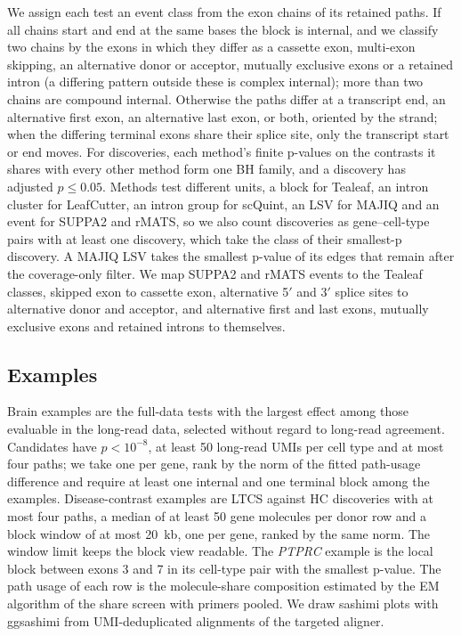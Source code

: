 \documentclass[11pt]{article}
\begin{document}
We assign each test an event class from the exon chains of its retained paths. If all chains start and end at the same bases the block is internal, and we classify two chains by the exons in which they differ as a cassette exon, multi-exon skipping, an alternative donor or acceptor, mutually exclusive exons or a retained intron (a differing pattern outside these is complex internal); more than two chains are compound internal. Otherwise the paths differ at a transcript end, an alternative first exon, an alternative last exon, or both, oriented by the strand; when the differing terminal exons share their splice site, only the transcript start or end moves. For discoveries, each method's finite p-values on the contrasts it shares with every other method form one BH family, and a discovery has adjusted $p\le0.05$. Methods test different units, a block for Tealeaf, an intron cluster for LeafCutter, an intron group for scQuint, an LSV for MAJIQ and an event for SUPPA2 and rMATS, so we also count discoveries as gene--cell-type pairs with at least one discovery, which take the class of their smallest-p discovery. A MAJIQ LSV takes the smallest p-value of its edges that remain after the coverage-only filter. We map SUPPA2 and rMATS events to the Tealeaf classes, skipped exon to cassette exon, alternative 5$'$ and 3$'$ splice sites to alternative donor and acceptor, and alternative first and last exons, mutually exclusive exons and retained introns to themselves.

\subsection{Examples}

Brain examples are the full-data tests with the largest effect among those evaluable in the long-read data, selected without regard to long-read agreement. Candidates have $p<10^{-8}$, at least 50 long-read UMIs per cell type and at most four paths; we take one per gene, rank by the norm of the fitted path-usage difference and require at least one internal and one terminal block among the examples. Disease-contrast examples are LTCS against HC discoveries with at most four paths, a median of at least 50 gene molecules per donor row and a block window of at most 20~kb, one per gene, ranked by the same norm. The window limit keeps the block view readable. The \emph{PTPRC} example is the local block between exons 3 and 7 in its cell-type pair with the smallest p-value. The path usage of each row is the molecule-share composition estimated by the EM algorithm of the share screen with primers pooled. We draw sashimi plots with ggsashimi \cite{garridomartin2018} from UMI-deduplicated alignments of the targeted aligner.
\end{document}
